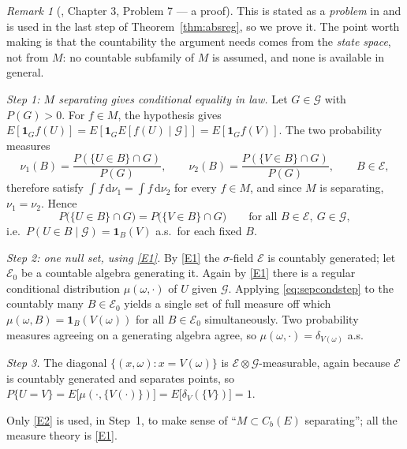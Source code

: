 \documentclass[11pt,a4paper]{article}
\theoremstyle{plain}
\theoremstyle{definition}
\theoremstyle{remark}
\newtheorem{remark}[theorem]{Remark}
\newcommand{\Cb}{C_b}                          %
\newcommand{\Gilt}{\mathcal{G}}
\newcommand{\one}{\mathbf{1}}
\newcommand{\dif}{\,\mathrm{d}}
\newcommand{\EK}{\cite{EK86}}
\begin{document}
\begin{remark}[\EK, Chapter 3, Problem 7 --- a proof]
  \label{rem:sepcondproof}
  This is stated as a \emph{problem} in \EK{} and is used in the last step of
  Theorem~\ref{thm:absreg}, so we prove it.  The point worth making is that the
  countability the argument needs comes from the \emph{state space}, not from
  $M$: no countable subfamily of $M$ is assumed, and none is available in general.

  \emph{Step 1: $M$ separating gives conditional equality in law.}
  Let $G \in \Gilt$ with $P(G) > 0$.  For $f \in M$, the hypothesis gives
  $E[\one_G f(U)] = E[\one_G E[f(U)\mid\Gilt]] = E[\one_G f(V)]$.  The two
  probability measures
  \[
    \nu_1(B) = \frac{P(\{U \in B\} \cap G)}{P(G)} , \qquad
    \nu_2(B) = \frac{P(\{V \in B\} \cap G)}{P(G)} ,
    \qquad B \in \mathcal{E},
  \]
  therefore satisfy $\int f \dif\nu_1 = \int f \dif\nu_2$ for every $f \in M$, and
  since $M$ is separating, $\nu_1 = \nu_2$.  Hence
  \begin{equation}
    \label{eq:sepcondstep}
    P\bigl( \{U \in B\} \cap G \bigr) = P\bigl( \{V \in B\} \cap G \bigr)
    \qquad \text{for all } B \in \mathcal{E},\ G \in \Gilt ,
  \end{equation}
  i.e.\ $P(U \in B \mid \Gilt) = \one_B(V)$ a.s.\ for each fixed $B$.

  \emph{Step 2: one null set, using \eqref{E1}.}
  By \eqref{E1} the $\sigma$-field $\mathcal{E}$ is countably generated; let
  $\mathcal{E}_0$ be a countable algebra generating it.  Again by \eqref{E1} there is a
  regular conditional distribution $\mu(\omega,\cdot)$ of $U$ given $\Gilt$.
  Applying \eqref{eq:sepcondstep} to the countably many $B \in \mathcal{E}_0$
  yields a single set of full measure off which
  $\mu(\omega,B) = \one_B(V(\omega))$ for all $B \in \mathcal{E}_0$
  simultaneously.  Two probability measures agreeing on a generating algebra
  agree, so $\mu(\omega,\cdot) = \delta_{V(\omega)}$ a.s.

  \emph{Step 3.}  The diagonal $\{(x,\omega) : x = V(\omega)\}$ is
  $\mathcal{E}\otimes\Gilt$-measurable, again because $\mathcal{E}$ is countably
  generated and separates points, so
  $P\{U = V\} = E\bigl[ \mu(\cdot,\{V(\cdot)\}) \bigr]
   = E\bigl[ \delta_{V}(\{V\}) \bigr] = 1$.

  Only \eqref{E2} is used, in Step~1, to make sense of ``$M \subset \Cb(E)$
  separating''; all the measure theory is \eqref{E1}.
\end{remark}
\end{document}
